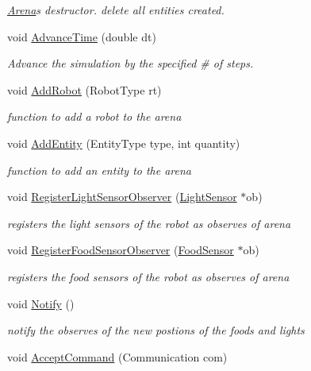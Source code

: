 \begin{DoxyCompactItemize}
\begin{DoxyCompactList}\small\item\em \hyperlink{classArena}{Arena}\textquotesingle{}s destructor. {\ttfamily delete} all entities created. \end{DoxyCompactList}\item 
void \hyperlink{classArena_ad92d8b2e1593b652445e31d173977fc6}{Advance\+Time} (double dt)
\begin{DoxyCompactList}\small\item\em Advance the simulation by the specified \# of steps. \end{DoxyCompactList}\item 
void \hyperlink{classArena_a256107e8346f7fbfd0294bd9da339537}{Add\+Robot} (Robot\+Type rt)
\begin{DoxyCompactList}\small\item\em function to add a robot to the arena \end{DoxyCompactList}\item 
void \hyperlink{classArena_a9e00ef1a079d49d648359952fcfaa9f3}{Add\+Entity} (Entity\+Type type, int quantity)
\begin{DoxyCompactList}\small\item\em function to add an entity to the arena \end{DoxyCompactList}\item 
void \hyperlink{classArena_a3166b6d49cc1fa5a526317ee55eefa16}{Register\+Light\+Sensor\+Observer} (\hyperlink{classLightSensor}{Light\+Sensor} $\ast$ob)
\begin{DoxyCompactList}\small\item\em registers the light sensors of the robot as observes of arena \end{DoxyCompactList}\item 
void \hyperlink{classArena_acb467d8cd9635b2dd0a3a22f08f543c7}{Register\+Food\+Sensor\+Observer} (\hyperlink{classFoodSensor}{Food\+Sensor} $\ast$ob)
\begin{DoxyCompactList}\small\item\em registers the food sensors of the robot as observes of arena \end{DoxyCompactList}\item 
void \hyperlink{classArena_a694758081979e9944031000a375a3a6a}{Notify} ()\hypertarget{classArena_a694758081979e9944031000a375a3a6a}{}\label{classArena_a694758081979e9944031000a375a3a6a}

\begin{DoxyCompactList}\small\item\em notify the observes of the new postions of the foods and lights \end{DoxyCompactList}\item 
void \hyperlink{classArena_a16fac8e4b2399fcf0db01a9722069c33}{Accept\+Command} (Communication com)\hypertarget{classArena_a16fac8e4b2399fcf0db01a9722069c33}{}\label{classArena_a16fac8e4b2399fcf0db01a9722069c33}


\end{DoxyCompactItemize}
